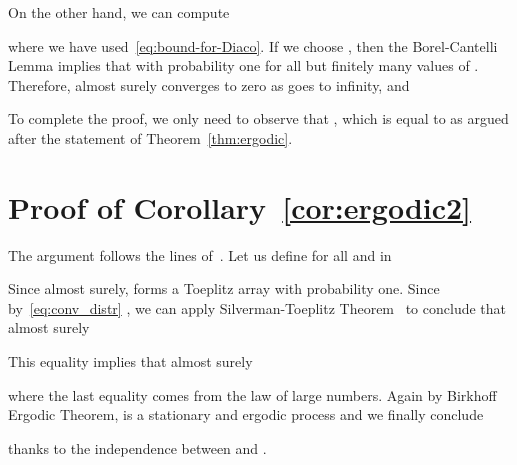 \documentclass{IEEEtran}
\newcommand{\1}{\mathbf{1}} \newcommand{\ind}{\mathds{1}}
\begin{document}
On the other hand, we can compute 

where we have used~\eqref{eq:bound-for-Diaco}.
If we choose , then the Borel-Cantelli Lemma \cite[Theorem~1.4.2]{VB:95} implies that with probability one  for all but finitely many values
of . Therefore, almost surely  converges
 to zero as  goes to infinity, and 

To complete the proof, we only need to observe that , which is equal to  as argued after the statement of Theorem~\ref{thm:ergodic}.

\section{Proof of Corollary~\ref{cor:ergodic2}}\label{sec:proofB}
The argument follows the lines of~\cite[Theorem 4.1]{KY-SS-LQ:14}.
Let us define for all  and  in 

Since  almost surely,  forms a Toeplitz array with probability one.
Since by~\eqref{eq:conv_distr} , we can apply Silverman-Toeplitz Theorem~\cite{OT:11} to conclude that almost surely 

This equality implies that almost surely

where the last equality comes from the law of large numbers. 
Again by Birkhoff Ergodic Theorem,  is a stationary and ergodic process and we finally conclude

thanks to the independence between  and .



\end{document}

